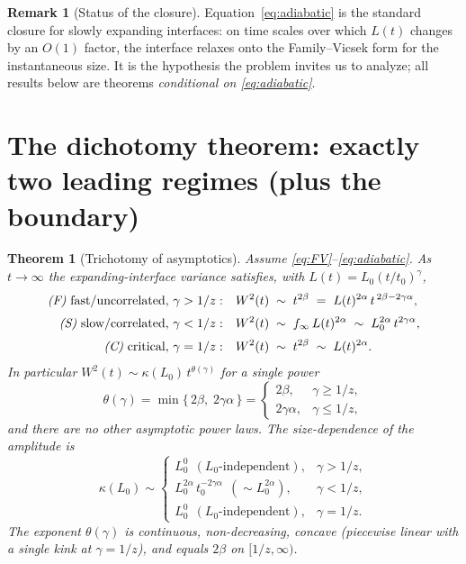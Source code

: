 \documentclass{amsart}
\newtheorem{theorem}{Theorem}
\theoremstyle{definition}
\newtheorem{remark}{Remark}
\newcommand{\asymp}{\sim}
\begin{document}
\begin{remark}[Status of the closure]
Equation~\eqref{eq:adiabatic} is the standard closure for slowly expanding
interfaces: on time scales over which $L(t)$ changes by an $O(1)$ factor, the
interface relaxes onto the Family--Vicsek form for the instantaneous size. It is
the hypothesis the problem invites us to analyze; all results below are theorems
\emph{conditional on \eqref{eq:adiabatic}}.
\end{remark}

\section{The dichotomy theorem: exactly two leading regimes (plus the boundary)}
\label{sec:dichotomy}

\begin{theorem}[Trichotomy of asymptotics]\label{thm:main}
Assume \eqref{eq:FV}--\eqref{eq:adiabatic}. As $t\to\infty$ the expanding-interface
variance satisfies, with $L(t)=L_0(t/t_0)^{\gamma}$,
\begin{align}
  \text{\emph{(F)} fast/uncorrelated, } \gamma>1/z:\quad
    & W^2(t)\;\asymp\; t^{2\beta}
      \;=\; L(t)^{2\alpha}\,t^{\,2\beta-2\gamma\alpha},
      \label{eq:fast}\\[2pt]
  \text{\emph{(S)} slow/correlated, } \gamma<1/z:\quad
    & W^2(t)\;\asymp\; f_\infty\,L(t)^{2\alpha}
      \;\asymp\; L_0^{2\alpha}\,t^{2\gamma\alpha},
      \label{eq:slow}\\[2pt]
  \text{\emph{(C)} critical, } \gamma=1/z:\quad
    & W^2(t)\;\asymp\; t^{2\beta}\;\asymp\;L(t)^{2\alpha}.
      \label{eq:crit}
\end{align}
In particular $W^2(t)\asymp \kappa(L_0)\,t^{\theta(\gamma)}$ for a single power
\begin{equation}\label{eq:theta}
  \theta(\gamma)=\min\{\,2\beta,\;2\gamma\alpha\,\}
  =\begin{cases}2\beta, & \gamma\ge 1/z,\\[2pt] 2\gamma\alpha, & \gamma\le 1/z,\end{cases}
\end{equation}
and there are \emph{no other} asymptotic power laws. The size-dependence of the
amplitude is
\begin{equation}\label{eq:kappa}
  \kappa(L_0)\asymp
  \begin{cases}
    L_0^{0}\ \ (\text{$L_0$-independent}), & \gamma>1/z,\\[2pt]
    L_0^{2\alpha}\,t_0^{-2\gamma\alpha}\ \ (\text{$\asymp L_0^{2\alpha}$}), & \gamma<1/z,\\[2pt]
    L_0^{0}\ \ (\text{$L_0$-independent}), & \gamma=1/z.
  \end{cases}
\end{equation}
The exponent $\theta(\gamma)$ is continuous, non-decreasing, concave (piecewise
linear with a single kink at $\gamma=1/z$), and equals $2\beta$ on $[1/z,\infty)$.
\end{theorem}
\end{document}
